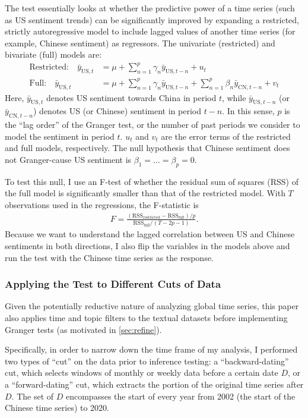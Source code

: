 \documentclass[12pt,letterpaper]{article}
\begin{document}
The test essentially looks at whether the predictive power of a time series (such as US sentiment trends) can be significantly improved by expanding a restricted, strictly autoregressive model to include lagged values of another time series (for example, Chinese sentiment) as regressors. The univariate (restricted) and bivariate (full) models are:
\begin{align}
  \text{Restricted:}\quad \bar{y}_{\mathrm{US},t} &= \mu + \sum_{n=1}^{p} \gamma_n \bar{y}_{\mathrm{US},t-n} + u_t \\
  \text{Full:}\quad \bar{y}_{\mathrm{US},t} &= \mu + \sum_{n=1}^{p} \gamma_n \bar{y}_{\mathrm{US},t-n} + \sum_{n=1}^{p} \beta_n \bar{y}_{\mathrm{CN},t-n} + v_t
\end{align}
Here, $\bar{y}_{\mathrm{US},t}$ denotes US sentiment towards China in period $t$, while $\bar{y}_{\mathrm{US},t-n}$ (or $\bar{y}_{\mathrm{CN},t-n}$) denotes US (or Chinese) sentiment in period $t-n$. In this sense, $p$ is the ``lag order'' of the Granger test, or the number of past periods we consider to model the sentiment in period $t$. $u_t$ and $v_t$ are the error terms of the restricted and full models, respectively. The null hypothesis that Chinese sentiment does not Granger-cause US sentiment is $\beta_1 = \dots = \beta_p = 0$.

To test this null, I use an F-test of whether the residual sum of squares (RSS) of the full model is significantly smaller than that of the restricted model. With $T$ observations used in the regressions, the F-statistic is
\begin{align}
  F = \frac{(\mathrm{RSS}_{\text{restricted}} - \mathrm{RSS}_{\text{full}}) / p}{\mathrm{RSS}_{\text{full}} / (T - 2p - 1)}.
\end{align}
Because we want to understand the lagged correlation between US and Chinese sentiments in both directions, I also flip the variables in the models above and run the test with the Chinese time series as the response.

\subsubsection*{Applying the Test to Different Cuts of Data}

Given the potentially reductive nature of analyzing global time series, this paper also applies time and topic filters to the textual datasets before implementing Granger tests (as motivated in \cref{sec:refine}).

Specifically, in order to narrow down the time frame of my analysis, I performed two types of ``cut'' on the data prior to inference testing: a ``backward-dating'' cut, which selects windows of monthly or weekly data before a certain date $D$, or a ``forward-dating'' cut, which extracts the portion of the original time series after $D$. The set of $D$ encompasses the start of every year from 2002 (the start of the Chinese time series) to 2020.
\end{document}
